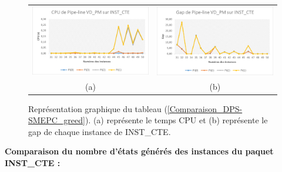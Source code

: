 \begin{figure}[H]
	\centering
	\begin{tabular}{c c}
		\includegraphics[width=9cm]{images_these/CPU_Pipe_INST_CTE.pdf}&
		\includegraphics[width=9cm]{images_these/Gap_Pipe_INST_CTE.pdf}
		\\
		(a) & (b)
	\end{tabular}
	\caption[Représentation graphique du CPU et du gap du tableau (\ref{Comparaison_DPS-SMEPC_greed})]{Représentation graphique du tableau (\ref{Comparaison_DPS-SMEPC_greed}). (a) représente le temps CPU et (b) représente le gap de chaque instance de INST\_CTE.}\label{gap_cpu_pipe_INST_}
\end{figure}


\textbf{Comparaison du nombre d'états générés des instances du paquet INST\_CTE :}


